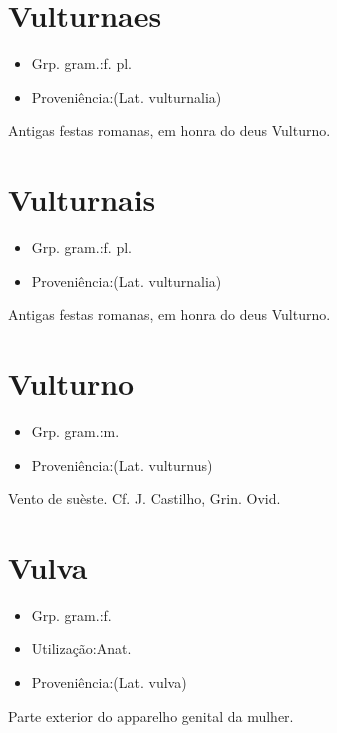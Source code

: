 \documentclass{article}
\begin{document}
\section{Vulturnaes}
\begin{itemize}
\item {Grp. gram.:f. pl.}
\end{itemize}
\begin{itemize}
\item {Proveniência:(Lat. \textunderscore vulturnalia\textunderscore )}
\end{itemize}
Antigas festas romanas, em honra do deus Vulturno.
\section{Vulturnais}
\begin{itemize}
\item {Grp. gram.:f. pl.}
\end{itemize}
\begin{itemize}
\item {Proveniência:(Lat. \textunderscore vulturnalia\textunderscore )}
\end{itemize}
Antigas festas romanas, em honra do deus Vulturno.
\section{Vulturno}
\begin{itemize}
\item {Grp. gram.:m.}
\end{itemize}
\begin{itemize}
\item {Proveniência:(Lat. \textunderscore vulturnus\textunderscore )}
\end{itemize}
Vento de suèste. Cf. J. Castilho, \textunderscore Grin. Ovid.\textunderscore 
\section{Vulva}
\begin{itemize}
\item {Grp. gram.:f.}
\end{itemize}
\begin{itemize}
\item {Utilização:Anat.}
\end{itemize}
\begin{itemize}
\item {Proveniência:(Lat. \textunderscore vulva\textunderscore )}
\end{itemize}
Parte exterior do apparelho genital da mulher.
\end{document}
